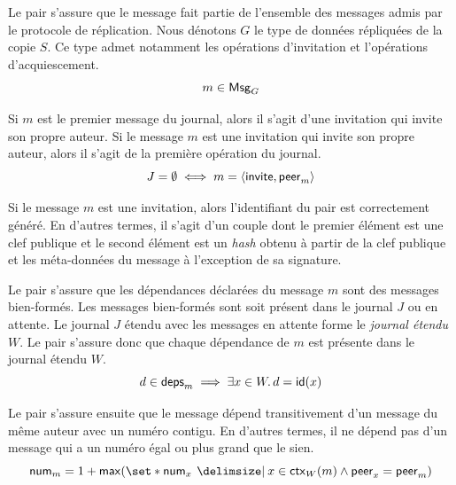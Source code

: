 
Le pair s'assure que le message fait partie de l'ensemble des messages admis par le protocole de réplication.
Nous dénotons $G$ le type de données répliquées de la copie $S$.
Ce type admet notamment les opérations d'invitation et l'opérations d'acquiescement.
%
\begin{equation}\label{eq:wf-msg-type-verif}
    m \in \trm{Msg}_G
\end{equation}

Si $m$ est le premier message du journal, alors il s'agit d'une invitation qui invite son propre auteur.
Si le message $m$ est une invitation qui invite son propre auteur, alors il s'agit de la première opération du journal.
%
\begin{equation}\label{eq:wf-first-invit-verif}
    J = \emptyset \iff m = \tuple*{\trm{invite}, \trm{peer}_m}
\end{equation}

Si le message $m$ est une invitation, alors l'identifiant du pair est correctement généré.
En d'autres termes, il s'agit d'un couple dont le premier élément est une clef publique et le second élément est un \emph{hash} obtenu à partir de la clef publique et les méta-données du message à l'exception de sa signature.

Le pair s'assure que les dépendances déclarées du message $m$ sont des messages bien-formés.
Les messages bien-formés sont soit présent dans le journal $J$ ou en attente.
Le journal $J$ étendu avec les messages en attente forme le \emph{journal étendu} $W$.
Le pair s'assure donc que chaque dépendance de $m$ est présente dans le journal étendu $W$.
%
\begin{equation}\label{eq:wf-deps-verif}
    d \in \trm{deps}_m \implies \exists x \in W \qsep d = \trm{id}(x)
\end{equation}

Le pair s'assure ensuite que le message dépend transitivement d'un message du même auteur avec un numéro contigu.
En d'autres termes, il ne dépend pas d'un message qui a un numéro égal ou plus grand que le sien.
%
\begin{equation}\label{eq:linear-verif}
    \trm{num}_m = 1 + \trm{max}(\set*{\trm{num}_x \given x \in \trm{ctx}_W(m) \land \trm{peer}_x = \trm{peer}_m})
\end{equation}

